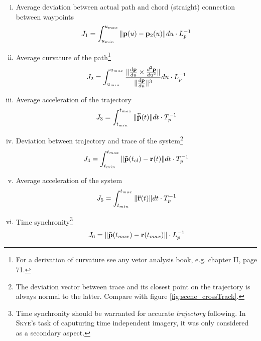 \begin{enumerate}[i)] 
\item Average deviation between actual path and chord (straight) connection between waypoints
\label{item:static_deviation}
\begin{equation}
J_1 = \int_{u_{min}}^{u_{max}} \|{\bf p}(u)- {\bf p}_2(u)\| du \cdot L_p^{-1} \label{eq:static_deviation}
\end{equation}

\item Average curvature of the path\footnote{For a derivation of curvature see any vetor analysis book, e.g. \cite{stammbach} chapter II, page 71.}
\label{item:static_curvature}
\begin{equation}
J_2 = \int_{u_{min}}^{u_{max}} \frac{\| \frac{d {\bf p}}{du} \times \frac{d^{2} {\bf p}}{du^{2}} \|}{\|  \frac{d {\bf p}}{du} \|^3}du \cdot L_p^{-1}
\label{eq:static_curvature}
\end{equation}

\item Average acceleration of the trajectory
\label{item:static_acceleration}
\begin{equation}
J_3 = \int_{t_{min}}^{t_{max}} \|{\bf \ddot{\tilde{p}}}(t)\| dt \cdot T_p^{-1} \label{eq:static_acceleration}
\end{equation}

\item Deviation between trajectory and trace of the system\footnote{The deviation vector between trace and its closest point on the trajectory is always normal to the latter. Compare with figure \ref{fig:scene_crossTrack}.}
\label{item:dynamic_deviation}
\begin{equation}
J_4 = \int_{t_{min}}^{t_{max}} \| {\bf \tilde{p}}(t_{cl}) - {\bf r}(t) \| dt \cdot T_p^{-1} 
\label{eq:dynamic_deviation}
\end{equation}

\item Average acceleration of the system
\label{item:dynamic_acceleration}
\begin{equation}
J_5 = \int_{t_{min}}^{t_{max}} \|{\bf \ddot{r}}(t)\| dt \cdot T_p^{-1}
\end{equation}

\item Time synchronity\footnote{Time synchronity should be warranted for accurate \textit{trajectory} following. In \textsc{Skye}'s task of caputuring time independent imagery, it was only considered as a secondary aspect.}
\label{item:dynamic_synchronity}
\begin{equation}
J_6 = \| {\bf \tilde{p}}(t_{max}) - {\bf r}(t_{max}) \| \cdot L_p^{-1} \label{eq:dynamic_synchronity}
\end{equation}

\end{enumerate}





